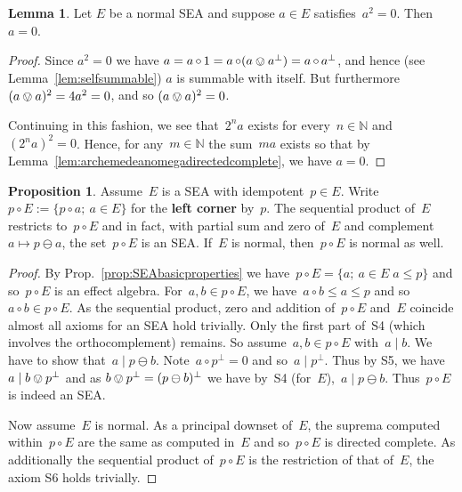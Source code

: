 \documentclass[a4paper, onecolumn, accepted=2020-12-22]{quantumarticle}
\newcommand{\N}{\mathbb{N}}
\newcommand\Define[1]{\textbf{#1}}
\newcommand{\mult}{\mathop{\circ}}
\newcommand{\commu}{\mathrel{\lvert}}
\newcounter{counter}
\theoremstyle{definition}
\newtheorem{proposition}[counter]{Proposition}
\newtheorem{lemma}[counter]{Lemma}
\begin{document}
\begin{lemma}\label{lem:nonilpotents}
    Let $E$ be a normal SEA and suppose $a\in E$
    satisfies~$a^2 = 0$.
        Then~$a = 0$.
\end{lemma}
\begin{proof}
    Since $a^2 = 0$ we have $a = a\mult 1 = a\mult (a\ovee a^\perp) = a\mult a^\perp$, and hence (see
    Lemma~\ref{lem:selfsummable}) $a$ is summable with itself. But
    furthermore~$(a\ovee a)^2 = 4a^2 = 0$, and so $(a\ovee a)^2=0$.

    Continuing in this fashion,
        we see that~$2^n a$ exists for every~$n \in \N$
        and~$(2^n a)^2 = 0$.
        Hence, for any~$m \in \N$
        the sum~$m a$ exists 
    so that by Lemma~\ref{lem:archemedeanomegadirectedcomplete},
    we have $a = 0$.
\end{proof}


\begin{proposition}
Assume~$E$ is a SEA with idempotent~$p \in E$.
Write~$p \mult E := \{ p\mult a; \ a \in E\}$
    for the \Define{left corner} by~$p$.
The sequential product of~$E$ restricts to~$p \mult E$
    and in fact, with partial sum and zero of~$E$
    and complement~$a \mapsto p \ominus a$,
    the set~$p \mult E$ is an SEA.
If~$E$ is normal, then~$p \mult E$ is normal as well.
\end{proposition}
\begin{proof}
By Prop.~\ref{prop:SEAbasicproperties}
    we have~$p \mult E = \{ a; \ a\in E\; a \leq p \}$
    and so~$p \mult E$  is an effect algebra.
For~$a,b \in p \mult E$,
    we have~$a \mult b \leq a \leq p$ and so~$a \mult b \in p \mult E$.
As the sequential product, zero and addition of~$p \mult E$ and~$E$ coincide
    almost all axioms for an SEA hold trivially.
    Only the first part of~S4 (which involves the orthocomplement) remains.
So assume~$a,b \in p\mult E $ with~$a \commu b$.
We have to show that~$a \commu p \ominus b$.
Note~$a \mult p^\perp = 0$ and so~$a \commu p^\perp$.
    Thus by S5, we have~$a \commu b \ovee p^\perp$ and as $b\ovee p^\perp = (p \ominus b)^\perp$ we have by~S4 (for~$E$),~$a \commu p \ominus b$.
        Thus~$p \mult E$ is indeed an SEA.

Now assume~$E$ is normal.
As a principal downset of~$E$,
    the suprema computed within~$p \mult E$
        are the same as computed in~$E$
        and so~$p \mult E$ is directed complete.
As additionally the sequential product of~$p \mult E$
    is the restriction of that of~$E$,
    the axiom S6 holds trivially.
\end{proof}
\end{document}
